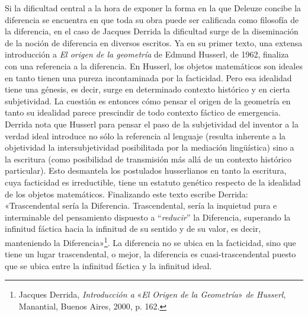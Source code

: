 Si la dificultad central a la hora de exponer la forma en la que Deleuze concibe la diferencia se encuentra en que toda su obra puede ser calificada como filosofía de la diferencia, en el caso de Jacques Derrida la dificultad surge de la diseminación de la noción de diferencia en diversos escritos. Ya en su primer texto, una extensa introducción a \emph{El origen de la geometría} de Edmund Husserl, de 1962, finaliza con una referencia a la diferencia. En Husserl, los objetos matemáticos son ideales en tanto tienen una pureza incontaminada por la facticidad. Pero esa idealidad tiene una génesis, es decir, surge en determinado contexto histórico y en cierta subjetividad. La cuestión es entonces cómo pensar el origen de la geometría en tanto su idealidad parece prescindir de todo contexto fáctico de emergencia. Derrida nota que Husserl para pensar el paso de la subjetividad del inventor a la verdad ideal introduce no sólo la referencia al lenguaje (resulta inherente a la objetividad la intersubjetividad posibilitada por la mediación lingüística) sino a la escritura (como posibilidad de transmisión más allá de un contexto histórico particular). Esto desmantela los postulados husserlianos en tanto la escritura, cuya facticidad es irreductible, tiene un estatuto genético respecto de la idealidad de los objetos matemáticos. Finalizando este texto escribe Derrida: «Trascendental sería la Diferencia. Trascendental, sería la inquietud pura e interminable del pensamiento dispuesto a ``\emph{reducir}'' la Diferencia, superando la infinitud fáctica hacia la infinitud de su sentido y de su valor, es decir, manteniendo la Diferencia»\footnote{Jacques Derrida, \emph{Introducción a} «\emph{El Origen de la Geometría}» \emph{de Husserl}, Manantial, Buenos Aires, 2000, p. 162.}. La diferencia no se ubica en la facticidad, sino que tiene un lugar trascendental, o mejor, la diferencia es cuasi-trascendental puesto que se ubica entre la infinitud fáctica y la infinitud ideal.

